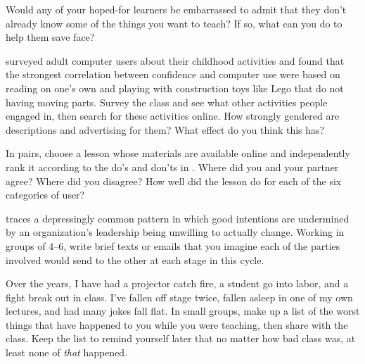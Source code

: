 
Would any of your hoped-for learners be embarrassed to admit that
they don't already know some of the things you want to teach?
If so,
what can you do to help them save face?


\cite{Cutt2017} surveyed adult computer users about their childhood activities
and found that the strongest correlation between confidence and computer use
were based on reading on one's own and playing with construction toys like Lego that do not having moving parts.
Survey the class and see what other activities people engaged in,
then search for these activities online.
How strongly gendered are descriptions and advertising for them?
What effect do you think this has?


In pairs,
choose a lesson whose materials are available online
and independently rank it according to the do's and don'ts in
.
Where did you and your partner agree?
Where did you disagree?
How well did the lesson do for each of the six categories of user?


\cite{Coco2018} traces a depressingly common pattern
in which good intentions are undermined by
an organization's leadership being unwilling to actually change.
Working in groups of 4--6,
write brief texts or emails that you imagine each of the parties involved would send to the other
at each stage in this cycle.


Over the years,
I have had a projector catch fire,
a student go into labor,
and a fight break out in class.
I've fallen off stage twice,
fallen asleep in one of my own lectures,
and had many jokes fall flat.
In small groups,
make up a list of the worst things that have happened to you while you were teaching,
then share with the class.
Keep the list to remind yourself later that no matter how bad class was,
at least none of \emph{that} happened.
